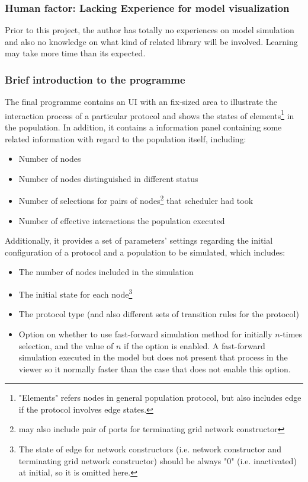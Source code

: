 \subsubsection{Human factor: Lacking Experience for model visualization}

\par\noindent
Prior to this project, the author has totally no experiences on model simulation and
also no knowledge on what kind of related library will be involved. Learning may take
more time than its expected.

\subsubsection{Brief introduction to the programme}

\par\noindent
The final programme contains an UI with an fix-sized area to illustrate the interaction process of
a particular protocol and shows the states of elements\footnote{\noindent "Elements" refers nodes in general population protocol,
but also includes edge if the protocol involves edge states.} in the population.
In addition, it contains a information panel containing some related
information with regard to the population itself, including:
\begin{itemize}
  \item Number of nodes
  \item Number of nodes distinguished in different status
  \item Number of selections for pairs of nodes\footnote{may also include pair of ports for terminating grid network constructor} that scheduler had took
  \item Number of effective interactions the population executed
\end{itemize}

\par\noindent
Additionally, it provides a set of parameters' settings regarding the initial configuration of a protocol and a population to be simulated, which includes:
\begin{itemize}
  \item The number of nodes included in the simulation
  \item The initial state for each node\footnote{\noindent The state of edge for network constructors (i.e. network constructor and terminating grid network constructor) should be always "0" (i.e. inactivated) at initial, so it is omitted here.}
  \item The protocol type (and also different sets of transition rules for the protocol)
  \item Option on whether to use fast-forward simulation method for initially $n$-times selection, and the value of $n$ if the option is enabled.
  A fast-forward simulation executed in the model but does not present that process in the viewer so it normally faster than the case that does not enable this option.
\end{itemize}

